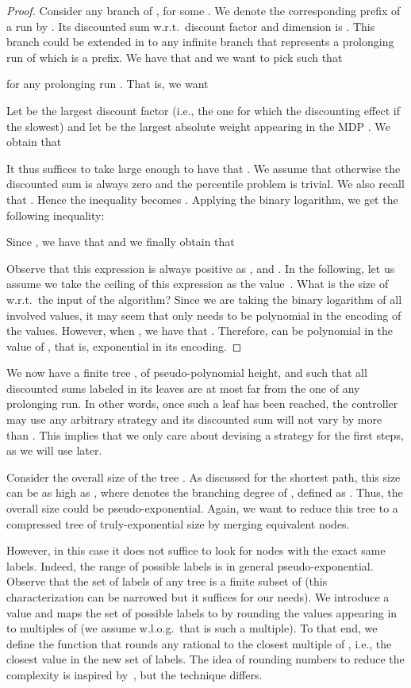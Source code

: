 \documentclass{llncs}
\begin{document}
\begin{proof}
Consider any branch of , for some . We denote the corresponding prefix of a run by . Its discounted sum w.r.t.~discount factor  and dimension  is . This branch could be extended in  to any infinite branch that represents a prolonging run  of which  is a prefix. We have that  and we want to pick  such that

for any prolonging run . That is, we want

Let  be the largest discount factor (i.e., the one for which the discounting effect if the slowest) and let  be the largest absolute weight appearing in the MDP . We obtain that

It thus suffices to take  large enough to have that . We assume that  otherwise the discounted sum is always zero and the percentile problem is trivial. We also recall that . Hence the inequality becomes . Applying the binary logarithm, we get the following inequality:

Since , we have that  and we finally obtain that

Observe that this expression is always positive as ,  and . In the following, let us assume we take the ceiling of this expression as the value~. What is the size of  w.r.t.~the input of the algorithm? Since we are taking the binary logarithm of all involved values, it may seem that  only needs to be polynomial in the encoding of the values. However, when , we have that . Therefore,  can be polynomial in the value of , that is, exponential in its encoding.
\end{proof}

We now have a finite tree , of pseudo-polynomial height, and such that all discounted sums labeled in its leaves are at most  far from the one of any prolonging run. In other words, once such a leaf has been reached, the controller may use any arbitrary strategy and its discounted sum will not vary by more than . This implies that we only care about devising a strategy for the  first steps, as we will use later.

Consider the overall size of the tree . As discussed for the shortest path, this size can be as high as , where  denotes the branching degree of , defined as . Thus, the overall size could be pseudo-exponential. Again, we want to reduce this tree  to a compressed tree of truly-exponential size by merging equivalent nodes.

However, in this case it does not suffice to look for nodes with the exact same labels. Indeed, the range of possible labels is in general pseudo-exponential. Observe that the set of labels of any tree  is a finite subset of  (this characterization can be narrowed but it suffices for our needs). We introduce a value  and maps the set of possible labels to  by rounding the values appearing in  to multiples of  (we assume w.l.o.g.~that  is such a multiple). To that end, we define the function  that rounds any rational  to the closest multiple of , i.e., the closest value in the new set of labels. The idea of rounding numbers to reduce the complexity is inspired by~\cite{DBLP:conf/fsttcs/BrazdilCFNS13}, but the technique differs.
\end{document}

